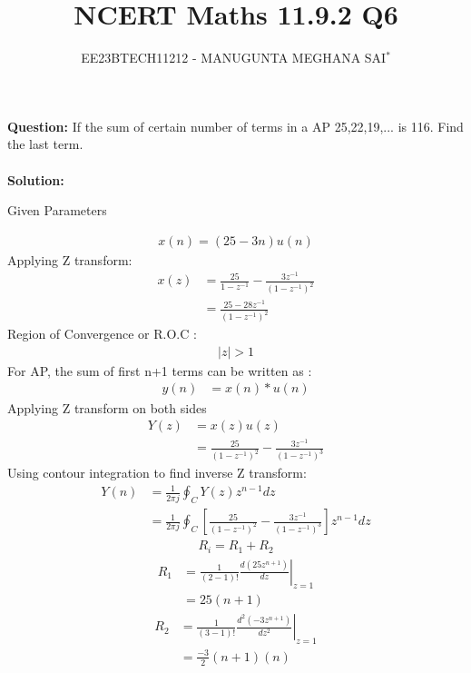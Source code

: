 \documentclass[journal,12pt,twocolumn]{IEEEtran}
\title{
	
	\title{NCERT Maths 11.9.2 Q6}
	\author{EE23BTECH11212 - MANUGUNTA MEGHANA SAI$^{*}$%
	}
	
	
}
\theoremstyle{remark}
\providecommand{\abs}[1]{\left\vert#1\right\vert}
\newcommand{\solution}{\noindent \textbf{Solution: }}
\begin{document}
	
	\maketitle
	
	\textbf{Question:} 
	If the sum of certain number of terms in a AP 25,22,19,... is 116. Find the last term.\\
	\\

	\solution
	 \begin{table}[h!]
	 	\centering
	 	\resizebox{6cm}{!}{
	 		
	 	}
	 	\caption{Given Parameters}
	 	\label{tab:my_label}
	 \end{table}

	\begin{align}
		x(n) = (25 - 3n)u(n)
		\label{eq:1}
	\end{align}
     Applying Z transform:
     \begin{align}
     	x(z) &=\frac{25}{1-z^{-1}} - \frac{3z^{-1}}{(1-z^{-1})^2}\\
     	&= \frac{25-28z^{-1}}{(1-z^{-1})^2} 
     \end{align}
     Region of Convergence or R.O.C :
     \begin{align}
     	\abs{z}>1
     \end{align}
For AP, the sum of first n+1 terms can be written as :
\begin{align}
	 y(n)&=x(n)*u(n)
\end{align}  
Applying Z transform on both sides
\begin{align}
	Y(z) &= x(z)u(z)\\
	&=\frac{25}{(1-z^{-1})^2} - \frac{3z^{-1}}{(1-z^{-1})^3}
\end{align}
Using contour integration to find inverse Z transform:
\begin{align}
	Y(n) &= \frac{1}{2\pi j} \oint_C Y(z) z^{n-1} dz\\
	&= \frac{1}{2\pi j} \oint_C [\frac{25}{(1-z^{-1})^2} - \frac{3z^{-1}}{(1-z^{-1})^3} ]z^{n-1} dz
\end{align}
\begin{align}
	R_i=R_1 + R_2
\end{align}
\begin{align}
		R_1 &= \frac{1}{{(2-1)!}} \left. \frac{d (25z^{n+1})}{dz} \right|_{z=1} \\
	&=25(n+1)
\end{align}
\begin{align}
	R_2 &= \frac{1}{{(3-1)!}} \left. \frac{d^2(-3z^{n+1})}{dz^2} \right|_{z=1} \\
	&= \frac{-3}{2}(n+1)(n)
\end{align}
\end{document}
